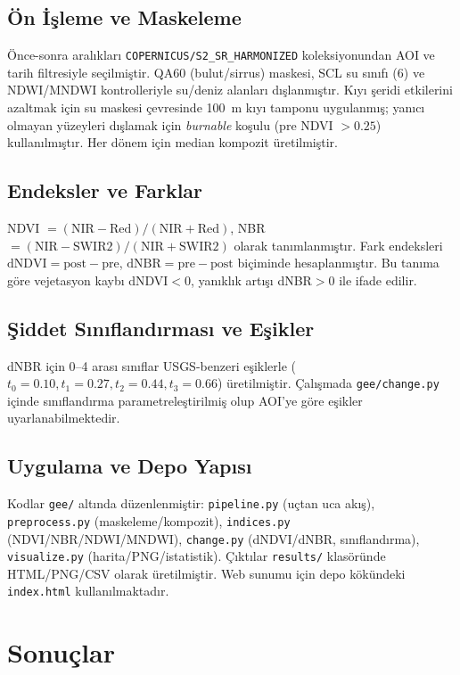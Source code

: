 \documentclass[11pt,a4paper]{article}
\begin{document}
\subsection{Ön İşleme ve Maskeleme}
Önce-sonra aralıkları \texttt{COPERNICUS/S2\_SR\_HARMONIZED} koleksiyonundan AOI ve tarih filtresiyle seçilmiştir. QA60 (bulut/sirrus) maskesi, SCL su sınıfı (6) ve NDWI/MNDWI kontrolleriyle su/deniz alanları dışlanmıştır. Kıyı şeridi etkilerini azaltmak için su maskesi çevresinde \SI{100}{m} kıyı tamponu uygulanmış; yanıcı olmayan yüzeyleri dışlamak için \emph{burnable} koşulu (pre NDVI $>0.25$) kullanılmıştır. Her dönem için median kompozit üretilmiştir.

\subsection{Endeksler ve Farklar}
NDVI $=(\mathrm{NIR}-\mathrm{Red})/(\mathrm{NIR}+\mathrm{Red})$, NBR $=(\mathrm{NIR}-\mathrm{SWIR2})/(\mathrm{NIR}+\mathrm{SWIR2})$ olarak tanımlanmıştır. Fark endeksleri \(\mathrm{dNDVI}=\mathrm{post}-\mathrm{pre}\), \(\mathrm{dNBR}=\mathrm{pre}-\mathrm{post}\) biçiminde hesaplanmıştır. Bu tanıma göre vejetasyon kaybı dNDVI$<0$, yanıklık artışı dNBR$>0$ ile ifade edilir.

\subsection{Şiddet Sınıflandırması ve Eşikler}
dNBR için 0--4 arası sınıflar USGS-benzeri eşiklerle (\(t_0=0.10, t_1=0.27, t_2=0.44, t_3=0.66\)) üretilmiştir. Çalışmada \texttt{gee/change.py} içinde sınıflandırma parametreleştirilmiş olup AOI'ye göre eşikler uyarlanabilmektedir.

\subsection{Uygulama ve Depo Yapısı}
Kodlar \texttt{gee/} altında düzenlenmiştir: \texttt{pipeline.py} (uçtan uca akış), \texttt{preprocess.py} (maskeleme/kompozit), \texttt{indices.py} (NDVI/NBR/NDWI/MNDWI), \texttt{change.py} (dNDVI/dNBR, sınıflandırma), \texttt{visualize.py} (harita/PNG/istatistik). Çıktılar \texttt{results/} klasöründe HTML/PNG/CSV olarak üretilmiştir. Web sunumu için depo kökündeki \texttt{index.html} kullanılmaktadır.

\section{Sonuçlar}
\end{document}
